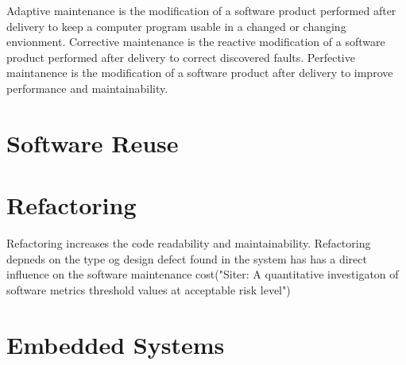 Adaptive maintenance is the modification of a software product performed after delivery to keep a computer program usable in a changed or changing envionment. Corrective maintenance is the reactive modification of a software product performed after delivery to correct discovered faults. Perfective maintanence is the modification of a software product after delivery to improve performance and maintainability.


\section{Software Reuse}





\section{Refactoring}
Refactoring increases the code readability and maintainability. Refactoring depneds on the type og design defect found in the system has has a direct influence on the software maintenance cost("Siter: A quantitative investigaton of software metrics threshold values at acceptable risk level")




\section{Embedded Systems}

